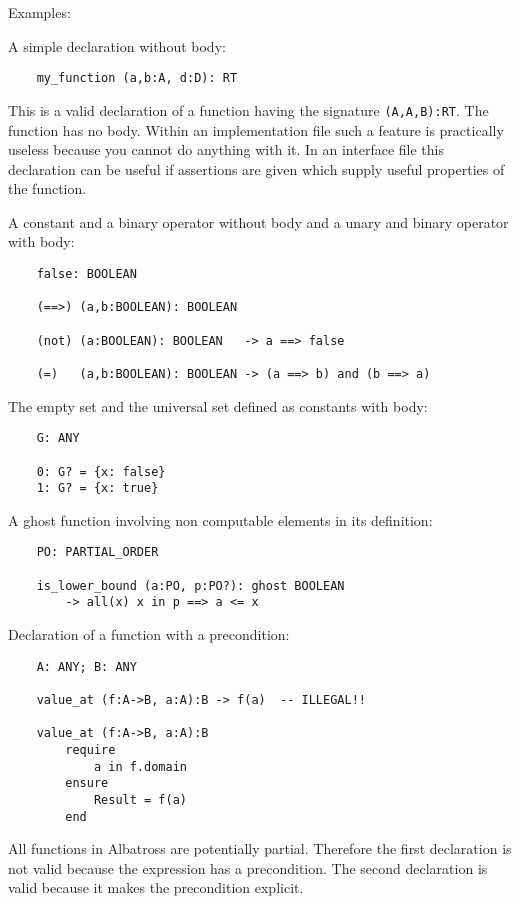 \noindent Examples:

\noindent A simple declaration without body:
\begin{lstlisting}
    my_function (a,b:A, d:D): RT
\end{lstlisting}
%
This is a valid declaration of a function having the signature
\lstinline!(A,A,B):RT!. The function has no body. Within an implementation
file such a feature is practically useless because you cannot do anything with
it. In an interface file this declaration can be useful if assertions are
given which supply useful properties of the function.

\noindent A constant and a binary operator without body and a unary and binary operator
with body:
\begin{lstlisting}
    false: BOOLEAN

    (==>) (a,b:BOOLEAN): BOOLEAN

    (not) (a:BOOLEAN): BOOLEAN   -> a ==> false

    (=)   (a,b:BOOLEAN): BOOLEAN -> (a ==> b) and (b ==> a)
\end{lstlisting}

\noindent The empty set and the universal set defined as constants with body:
\begin{lstlisting}
    G: ANY

    0: G? = {x: false}
    1: G? = {x: true}
\end{lstlisting}


\noindent A ghost function involving non computable elements in its definition:
\begin{lstlisting}
    PO: PARTIAL_ORDER

    is_lower_bound (a:PO, p:PO?): ghost BOOLEAN
        -> all(x) x in p ==> a <= x
\end{lstlisting}


\noindent Declaration of a function with a precondition:
\begin{lstlisting}
    A: ANY; B: ANY

    value_at (f:A->B, a:A):B -> f(a)  -- ILLEGAL!!

    value_at (f:A->B, a:A):B
        require
            a in f.domain
        ensure
            Result = f(a)
        end
\end{lstlisting}
%
All functions in Albatross are potentially partial. Therefore the first
declaration is not valid because the expression has a precondition. The second
declaration is valid because it makes the precondition explicit.

